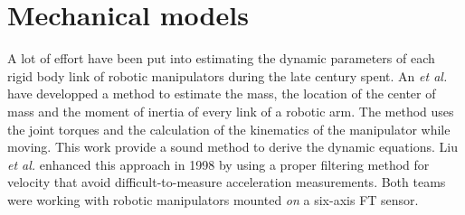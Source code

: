 \documentclass[/home/francois/latex/report/main.tex]{subfiles}
\begin{document}
%
%

\section{Mechanical models}
\label{section:mechanical-models}

A lot of effort have been put into estimating the dynamic parameters of each rigid body link of robotic manipulators during the late century spent. An \textit{et al.} \cite{An1985} have developped a method to estimate the mass, the location of the center of mass and the moment of inertia of every link of a robotic arm. The method uses the joint torques and the calculation of the kinematics of the manipulator while moving. This work provide a sound method to derive the dynamic equations. Liu \textit{et al.} enhanced this approach in 1998 \cite{Liu1998} by using a proper filtering method for velocity that avoid difficult-to-measure acceleration measurements. Both teams were working with robotic manipulators mounted \textit{on} a six-axis \ac{FT} sensor.
\end{document}
